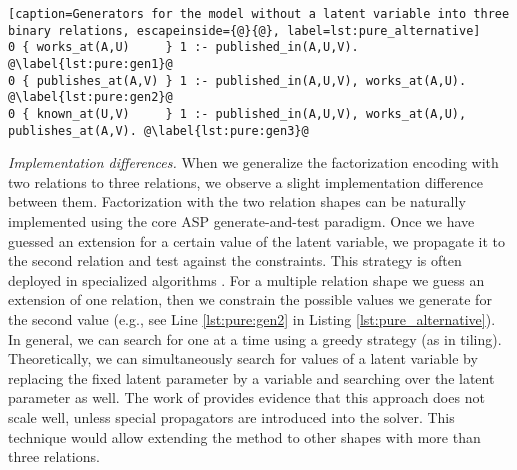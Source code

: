 \begin{lstlisting}[caption=Generators for the model without a latent variable into three binary relations, escapeinside={@}{@}, label=lst:pure_alternative] 
0 { works_at(A,U)     } 1 :- published_in(A,U,V). @\label{lst:pure:gen1}@
0 { publishes_at(A,V) } 1 :- published_in(A,U,V), works_at(A,U). @\label{lst:pure:gen2}@
0 { known_at(U,V)     } 1 :- published_in(A,U,V), works_at(A,U), publishes_at(A,V). @\label{lst:pure:gen3}@
\end{lstlisting}


\textit{Implementation differences.} When we generalize the factorization encoding with two relations to three relations, we observe a slight implementation difference between them. Factorization with the two relation shapes can be naturally implemented using the core ASP generate-and-test paradigm. Once we have guessed an extension for a certain value of the latent variable, we propagate it to the second relation and test against the constraints. This strategy is often deployed in specialized algorithms \citep{tiling, dbp}.
For a multiple relation shape we guess an extension of one relation, then we constrain the possible values we generate for the second value (e.g., see Line \ref{lst:pure:gen2} in Listing \ref{lst:pure_alternative}). In general, we can search for one at a time using a greedy strategy (as in tiling). Theoretically, we can simultaneously search for values of a latent variable by replacing the fixed latent parameter by a variable and searching over the latent parameter as well. The work of \cite{tias_topk} provides evidence that this approach does not scale well, unless special propagators are introduced into the solver. This technique would allow extending the method to other shapes with more than three relations.
